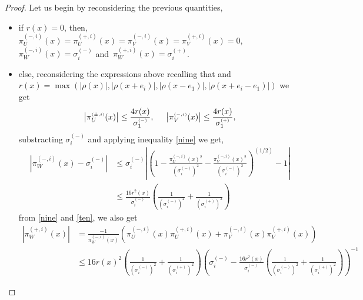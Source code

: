 \documentclass[12pt]{article}
\theoremstyle{Theorem}
\begin{document}
\begin{proof}
Let us begin by reconsidering the previous quantities, 
\begin{itemize}
  \item if $r(x) = 0$, then, $\pi^{\scriptscriptstyle(-, i)}_{U}(x) = \pi^{\scriptscriptstyle(+, i)}_{U}(x) = \pi^{\scriptscriptstyle(-, i)}_{V}(x) = \pi^{\scriptscriptstyle(+, i)}_{V}(x) = 0$, $\pi^{\scriptscriptstyle(-, i)}_{W}(x) = \sigma^{(-)}_{i}$ and~$\pi^{\scriptscriptstyle(+, i)}_{W}(x) = \sigma^{(+)}_{i}$. 
  \item else, reconsidering the expressions above recalling that \linebreak and $r(x) = \max\left(|\rho(x)|, |\rho(x + e_i)|, |\rho(x-e_1)|, |\rho(x +e_i - e_1)| \right)$ we get 
  \begin{align}
  \label{nine}
   \left|\pi^{\scriptscriptstyle(\pm, i)}_{U}(x)\right| \leq \frac{4r(x)}{\sigma^{\scriptscriptstyle (-)}_{1}}, \hspace{0.5cm} \left|\pi^{\scriptscriptstyle(-, i)}_{V}(x)\right| \leq \frac{4r(x)}{\sigma^{\scriptscriptstyle (+)}_{1}},
   \end{align}
   substracting $\sigma^{(-)}_{i}$ and applying inequality \eqref{nine} we get, 
   \begin{align}
   \label{ten}
   \left|\pi^{\scriptscriptstyle(-, i)}_{W}(x) - \sigma^{(-)}_{i}\right| & \leq \sigma^{(-)}_{i}\left| \left(1 - \frac{\pi^{\scriptscriptstyle(-, i)}_{U}(x)^{2}}{\left(\sigma^{(-)}_{i}\right)^{2}} - \frac{\pi^{\scriptscriptstyle(-, i)}_{V}(x)^{2}}{\left(\sigma^{(-)}_{i}\right)^{2}}\right)^{\scriptscriptstyle (1/2)} - 1  \right| \nonumber \\
   & \leq \frac{16r^{2}(x)}{\sigma^{(-)}_{i}}\left(\frac{1}{(\sigma^{(-)}_{i})^{2}} + \frac{1}{(\sigma^{(+)}_{i})^{2}} \right)
   \end{align}
   from \eqref{nine} and \eqref{ten}, we also get
   \begin{align}
   \label{eleven}
  \left|\pi^{\scriptscriptstyle(+, i)}_{W}(x)\right| & = \frac{-1}{\pi^{\scriptscriptstyle(-, i)}_{W}(x)}\left(\pi^{\scriptscriptstyle(-, i)}_{U}(x)\pi^{\scriptscriptstyle(+, i)}_{U}(x) + \pi^{\scriptscriptstyle(-, i)}_{V}(x)\pi^{\scriptscriptstyle(+, i)}_{V}(x)\right) \nonumber \\
  &\leq 16r(x)^{2}\left(\frac{1}{(\sigma^{(-)}_{i})^{2}} + \frac{1}{(\sigma^{(+)}_{i})^{2}} \right)\left(\sigma^{(-)}_{i} -  \frac{16r^{2}(x)}{\sigma^{(-)}_{i}}\left(\frac{1}{(\sigma^{(-)}_{i})^{2}} + \frac{1}{(\sigma^{(+)}_{i})^{2}} \right)\right)^{-1}

\end{align}
\end{itemize}
\end{proof}
\end{document}
